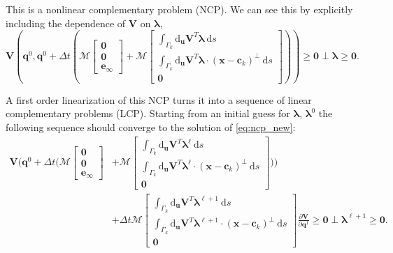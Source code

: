 \documentclass[preprint, 10pt]{elsarticle}
\begin{document}
This is a nonlinear complementary problem (NCP). We can see this by explicitly including the dependence of $\mathbf{V}$ on $\pmb{\lambda}$,
\[\mathbf{V}\left(\mathbf{q}^0, \mathbf{q}^0 +  \Delta t\left(\mathcal{M}\begin{bmatrix}\mathbf{0}\\\mathbf{0}\\\mathbf{e}_\infty\end{bmatrix} + \mathcal{M}\begin{bmatrix} \int_{\Gamma_k} \text{d}_\mathbf{u}\mathbf{V}^T\pmb{\lambda}~\text{d}s\\ \int_{\Gamma_k}  \text{d}_\mathbf{u}\mathbf{V}^T\pmb{\lambda}\cdot(\mathbf{x}-\mathbf{c}_k)^\perp~\text{d}s \\\mathbf{0}\end{bmatrix}\right)\right) \geq \mathbf{0} \perp\pmb{\lambda}\geq \mathbf{0} .\]

A first order linearization of this NCP turns it into a sequence of linear complementary problems (LCP). Starting from an initial guess for $\pmb{\lambda}$, $\pmb{\lambda}^0$ the following sequence should converge to the solution of \eqref{eq:ncp_new}:
\begin{equation}\label{eq:lcp}\begin{aligned}
\mathbf{V}\biggl(\mathbf{q}^0 + \Delta t\biggl(\mathcal{M}\begin{bmatrix}\mathbf{0}\\\mathbf{0}\\\mathbf{e}_\infty\end{bmatrix} &+ \mathcal{M}\begin{bmatrix} \int_{\Gamma_k} \text{d}_\mathbf{u}\mathbf{V}^T\pmb{\lambda}^\ell~\text{d}s\\ \int_{\Gamma_k}  \text{d}_\mathbf{u}\mathbf{V}^T\pmb{\lambda}^\ell\cdot(\mathbf{x}-\mathbf{c}_k)^\perp~\text{d}s \\\mathbf{0}\end{bmatrix}\biggr)\biggr) \\
&+ \Delta t \mathcal{M}\begin{bmatrix}\int_{\Gamma_k} \text{d}_\mathbf{u}\mathbf{V}^T\pmb{\lambda}^{\ell+1}~\text{d}s\\ \int_{\Gamma_k}  \text{d}_\mathbf{u}\mathbf{V}^T\pmb{\lambda}^{\ell+1}\cdot(\mathbf{x}-\mathbf{c}_k)^\perp~\text{d}s \\\mathbf{0}\end{bmatrix}\frac{\partial\mathbf{V}}{\partial \mathbf{q}^1} \geq \mathbf{0} \perp \pmb{\lambda}^{\ell+1} \geq \mathbf{0}.\end{aligned}\end{equation}
\end{document}
